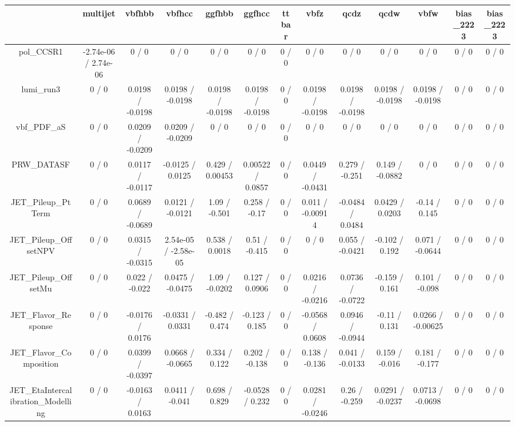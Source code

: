 \documentclass[10pt]{article}
\begin{document}
\begin{table}[htbp]
\begin{center}
\begin{tabular}{|c|c|c|c|c|c|c|c|c|c|c|c|c|}
\hline 
      & multijet      & vbfhbb      & vbfhcc      & ggfhbb      & ggfhcc      & ttbar      & vbfz      & qcdz      & qcdw      & vbfw      & bias_2223      & bias_2223 \\ 
\hline 
  pol_CCSR1 & -2.74e-06 / 2.74e-06 & 0 / 0 & 0 / 0 & 0 / 0 & 0 / 0 & 0 / 0 & 0 / 0 & 0 / 0 & 0 / 0 & 0 / 0 & 0 / 0 & 0 / 0 \\ 
  lumi_run3 & 0 / 0 & 0.0198 / -0.0198 & 0.0198 / -0.0198 & 0.0198 / -0.0198 & 0.0198 / -0.0198 & 0 / 0 & 0.0198 / -0.0198 & 0.0198 / -0.0198 & 0.0198 / -0.0198 & 0.0198 / -0.0198 & 0 / 0 & 0 / 0 \\ 
  vbf_PDF_aS & 0 / 0 & 0.0209 / -0.0209 & 0.0209 / -0.0209 & 0 / 0 & 0 / 0 & 0 / 0 & 0 / 0 & 0 / 0 & 0 / 0 & 0 / 0 & 0 / 0 & 0 / 0 \\ 
  PRW_DATASF & 0 / 0 & 0.0117 / -0.0117 & -0.0125 / 0.0125 & 0.429 / 0.00453 & 0.00522 / 0.0857 & 0 / 0 & 0.0449 / -0.0431 & 0.279 / -0.251 & 0.149 / -0.0882 & 0 / 0 & 0 / 0 & 0 / 0 \\ 
  JET_Pileup_PtTerm & 0 / 0 & 0.0689 / -0.0689 & 0.0121 / -0.0121 & 1.09 / -0.501 & 0.258 / -0.17 & 0 / 0 & 0.011 / -0.00914 & -0.0484 / 0.0484 & 0.0429 / 0.0203 & -0.14 / 0.145 & 0 / 0 & 0 / 0 \\ 
  JET_Pileup_OffsetNPV & 0 / 0 & 0.0315 / -0.0315 & 2.54e-05 / -2.58e-05 & 0.538 / 0.0018 & 0.51 / -0.415 & 0 / 0 & 0 / 0 & 0.055 / -0.0421 & -0.102 / 0.192 & 0.071 / -0.0644 & 0 / 0 & 0 / 0 \\ 
  JET_Pileup_OffsetMu & 0 / 0 & 0.022 / -0.022 & 0.0475 / -0.0475 & 1.09 / -0.0202 & 0.127 / 0.0906 & 0 / 0 & 0.0216 / -0.0216 & 0.0736 / -0.0722 & -0.159 / 0.161 & 0.101 / -0.098 & 0 / 0 & 0 / 0 \\ 
  JET_Flavor_Response & 0 / 0 & -0.0176 / 0.0176 & -0.0331 / 0.0331 & -0.482 / 0.474 & -0.123 / 0.185 & 0 / 0 & -0.0568 / 0.0608 & 0.0946 / -0.0944 & -0.11 / 0.131 & 0.0266 / -0.00625 & 0 / 0 & 0 / 0 \\ 
  JET_Flavor_Composition & 0 / 0 & 0.0399 / -0.0397 & 0.0668 / -0.0665 & 0.334 / 0.122 & 0.202 / -0.138 & 0 / 0 & 0.138 / -0.136 & 0.041 / -0.0133 & 0.159 / -0.016 & 0.181 / -0.177 & 0 / 0 & 0 / 0 \\ 
  JET_EtaIntercalibration_Modelling & 0 / 0 & -0.0163 / 0.0163 & 0.0411 / -0.041 & 0.698 / 0.829 & -0.0528 / 0.232 & 0 / 0 & 0.0281 / -0.0246 & 0.26 / -0.259 & 0.0291 / -0.0237 & 0.0713 / -0.0698 & 0 / 0 & 0 / 0 \\ 

\end{tabular}
\end{center}
\end{table}
\end{document}
